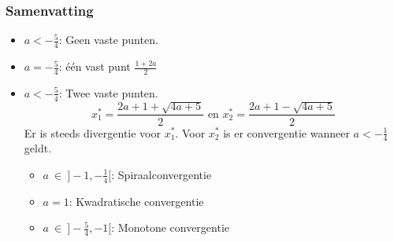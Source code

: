 \documentclass[examenvragen.tex]{subfiles}
\begin{document}
\subsubsection{Samenvatting}
\begin{itemize}
\item $a < -\frac{5}{4}$: Geen vaste punten.
\item $a = -\frac{5}{4}$: \'e\'en vast punt $\frac{1+2a}{2}$
\item $a < -\frac{5}{4}$: Twee vaste punten.
\[
x^{*}_1 = \frac{2a+1 +\sqrt{4a+5}}{2} \text{ en } x^{*}_{2}= \frac{2a+1 -\sqrt{4a+5}}{2}
\]
Er is steeds divergentie voor $x^{*}_1$. 
Voor $x^{*}_{2}$ is er convergentie wanneer $a< -\frac{1}{4}$ geldt.
\begin{itemize}
\item $a \ \in\  ]-1,-\frac{1}{4}[$: Spiraalconvergentie
\item $a=1$: Kwadratische convergentie
\item $a\ \in\ ]-\frac{5}{4},-1[$: Monotone convergentie
\end{itemize} 
\end{itemize}
\end{document}
